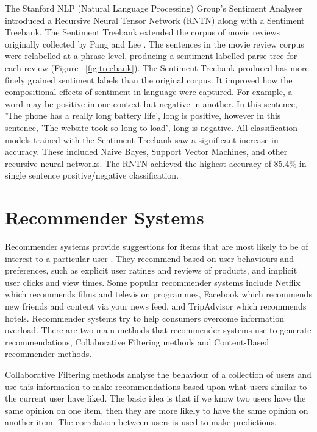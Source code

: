 The Stanford NLP (Natural Language Processing) Group's Sentiment Analyser \cite{stanfordSentiment2013} introduced a Recursive Neural Tensor Network (RNTN) along with a Sentiment Treebank. The Sentiment Treebank extended the corpus of movie reviews originally collected by Pang and Lee \cite{panglee2004}. The sentences in the movie review corpus were relabelled at a phrase level, producing a sentiment labelled parse-tree for each review (Figure ~\ref{fig:treebank}). The Sentiment Treebank produced has more finely grained sentiment labels than the original corpus. It improved how the compositional effects of sentiment in language were captured. For example, a word may be positive in one context but negative in another. In this sentence, 'The phone has a really long battery life', long is positive, however in this sentence, 'The website took so long to load', long is negative. All classification models trained with the Sentiment Treebank saw a significant increase in accuracy. These included Naive Bayes, Support Vector Machines, and other recursive neural networks. The RNTN achieved the highest accuracy of 85.4\% in single sentence positive/negative classification.

\section{Recommender Systems}


Recommender systems provide suggestions for items that are most likely to be of interest to a particular user \cite{Ricci2015}. They recommend based on user behaviours and preferences, such as explicit user ratings and reviews of products, and implicit user clicks and view times. Some popular recommender systems include Netflix which recommends films and television programmes, Facebook which recommends new friends and content via your news feed, and TripAdvisor which recommends hotels. Recommender systems try to help consumers overcome information overload. There are two main methods that recommender systems use to generate recommendations, Collaborative Filtering methods and Content-Based recommender methods. 

Collaborative Filtering methods analyse the behaviour of a collection of users and use this information to make recommendations based upon what users similar to the current user have liked. The basic idea is that if we know two users have the same opinion on one item, then they are more likely to have the same opinion on another item. The correlation between users is used to make predictions.

